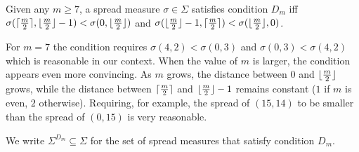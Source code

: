 \documentclass[version=3.21, pagesize, twoside=off, bibliography=totoc, DIV=calc, fontsize=12pt, a4paper]{scrartcl}
\begin{document}
\begin{definition}
    Given any $m \geq 7$, a spread measure $\sigma \in \Sigma$ satisfies condition $D_m$ iff 
    $\sigma(\lceil\frac{m}{2}\rceil, \lfloor\frac{m}{2}\rfloor - 1) < \sigma(0, \lfloor\frac{m}{2}\rfloor)$ and 
    $\sigma(\lfloor\frac{m}{2}\rfloor - 1, \lceil\frac{m}{2}\rceil) < \sigma(\lfloor\frac{m}{2}\rfloor, 0)$.
\end{definition}
For $m=7$ the condition requires $\sigma(4,2) < \sigma(0,3)$ and $\sigma(0,3) < \sigma(4,2)$ which is reasonable in our context. When the value of $m$ is larger, the condition appears even more convincing. As $m$ grows, the distance between $0$ and $\lfloor\frac{m}{2}\rfloor$ grows, while the distance between $\lceil\frac{m}{2}\rceil$ and $\lfloor\frac{m}{2}\rfloor - 1$ remains constant ($1$ if $m$ is even, $2$ otherwise). Requiring, for example, the spread of $(15,14)$ to be smaller than the spread of $(0,15)$ is very reasonable.

We write $\Sigma^{D_{m}} \subseteq \Sigma$ for the set of spread measures that satisfy condition $D_{m}$. 
\end{document}
